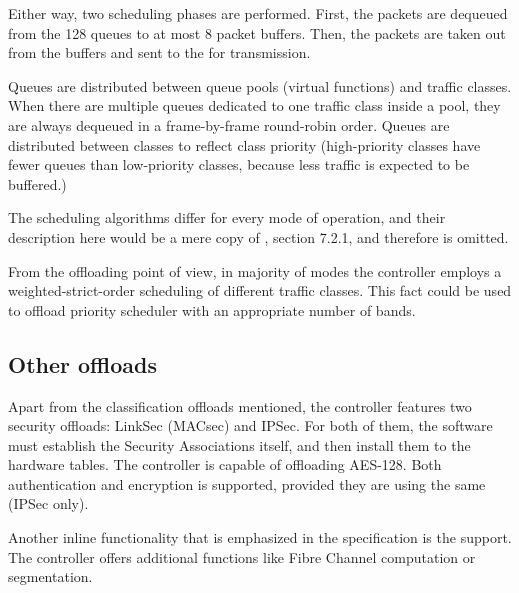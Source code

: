 Either way, two scheduling phases are performed. First, the packets are
dequeued from the 128 queues to at most 8 packet buffers. Then, the packets are
taken out from the buffers and sent to the  for transmission.

Queues are distributed between queue pools (virtual functions) and traffic
classes. When there are multiple queues dedicated to one traffic class inside
a pool, they are always dequeued in a frame-by-frame round-robin order. Queues
are distributed between classes to reflect class priority 
(high-priority classes have fewer queues than low-priority classes, because less
traffic is expected to be buffered.)

The scheduling algorithms differ for every mode of operation, and their
description here would be a mere copy of \cite{82599}, section 7.2.1, and
therefore is omitted.

From the offloading point of view, in majority of modes the controller employs
a weighted-strict-order scheduling of different traffic classes. This fact
could be used to offload priority scheduler with an appropriate number of bands.

\subsection{Other offloads}

Apart from the classification offloads mentioned, the controller features two
security offloads: LinkSec (MACsec) and IPSec. For both of them, the software
must establish the Security Associations itself, and then install them to the
hardware tables. The controller is capable of offloading AES-128. Both
authentication and encryption is supported, provided they are using the same
 (IPSec only). 

Another inline functionality that is emphasized in the specification is the
 support. The controller offers additional functions like Fibre
Channel  computation or  segmentation. 
